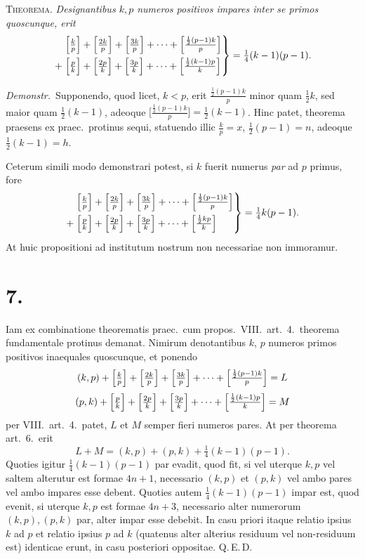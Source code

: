 \documentclass[11pt]{article}
\begin{document}
\textsc{Theorema.} \emph{Designantibus $k,p$ numeros positivos impares inter
se primos quoscunque, erit}
\[
  \left.
  \begin{aligned}
  &\Bigl[\tfrac{k}{p}\Bigr]+\Bigl[\tfrac{2k}{p}\Bigr]+\Bigl[\tfrac{3k}{p}\Bigr]
        +\dots+\Bigl[\tfrac{\frac{1}{2}(p-1)k}{p}\Bigr]\\
  +\;&\Bigl[\tfrac{p}{k}\Bigr]+\Bigl[\tfrac{2p}{k}\Bigr]+\Bigl[\tfrac{3p}{k}\Bigr]
        +\dots+\Bigl[\tfrac{\frac{1}{2}(k-1)p}{k}\Bigr]
  \end{aligned}
  \right\}=\tfrac{1}{4}(k-1)(p-1).
\]

\medskip
\emph{Demonstr.}\ Supponendo, quod licet, $k<p$, erit $\tfrac{\frac{1}{2}(p-1)k}{p}$
minor quam $\tfrac{1}{2}k$, sed maior quam $\tfrac{1}{2}(k-1)$, adeoque
$\bigl[\tfrac{\frac{1}{2}(p-1)k}{p}\bigr]=\tfrac{1}{2}(k-1)$. Hinc patet,
theorema praesens ex praec.\ protinus sequi, statuendo illic $\tfrac{k}{p}=x$,
$\tfrac{1}{2}(p-1)=n$, adeoque $\tfrac{1}{2}(k-1)=h$.

\medskip
Ceterum simili modo demonstrari potest, si $k$ fuerit numerus \emph{par} ad $p$
primus, fore
\[
  \left.
  \begin{aligned}
  &\Bigl[\tfrac{k}{p}\Bigr]+\Bigl[\tfrac{2k}{p}\Bigr]+\Bigl[\tfrac{3k}{p}\Bigr]
        +\dots+\Bigl[\tfrac{\frac{1}{2}(p-1)k}{p}\Bigr]\\
  +\;&\Bigl[\tfrac{p}{k}\Bigr]+\Bigl[\tfrac{2p}{k}\Bigr]+\Bigl[\tfrac{3p}{k}\Bigr]
        +\dots+\Bigl[\tfrac{\frac{1}{2}kp}{k}\Bigr]
  \end{aligned}
  \right\}=\tfrac{1}{4}k(p-1).
\]
At huic propositioni ad institutum nostrum non necessariae non immoramur.

\section*{7.}

Iam ex combinatione theorematis praec.\ cum propos.\ VIII.\ art.\ 4.\ theorema
fundamentale protinus demanat. Nimirum denotantibus $k$, $p$ numeros primos
positivos inaequales quoscunque, et ponendo
\[
  (k,p)+\Bigl[\tfrac{k}{p}\Bigr]+\Bigl[\tfrac{2k}{p}\Bigr]+\Bigl[\tfrac{3k}{p}\Bigr]
        +\dots+\Bigl[\tfrac{\frac{1}{2}(p-1)k}{p}\Bigr]=L
\]
\[
  (p,k)+\Bigl[\tfrac{p}{k}\Bigr]+\Bigl[\tfrac{2p}{k}\Bigr]+\Bigl[\tfrac{3p}{k}\Bigr]
        +\dots+\Bigl[\tfrac{\frac{1}{2}(k-1)p}{k}\Bigr]=M
\]
per VIII.\ art.\ 4.\ patet, $L$ et $M$ semper fieri numeros pares. At per
theorema art.\ 6.\ erit
\[
  L+M=(k,p)+(p,k)+\tfrac{1}{4}(k-1)(p-1).
\]
Quoties igitur $\tfrac{1}{4}(k-1)(p-1)$ par evadit, quod fit, si vel uterque
$k,p$ vel saltem alterutur est formae $4n+1$, necessario $(k,p)$ et $(p,k)$ vel
ambo pares vel ambo impares esse debent. Quoties autem $\tfrac{1}{4}(k-1)(p-1)$
impar est, quod evenit, si uterque $k,p$ est formae $4n+3$, necessario alter
numerorum $(k,p),(p,k)$ par, alter impar esse debebit. In casu priori itaque
relatio ipsius $k$ ad $p$ et relatio ipsius $p$ ad $k$ (quatenus alter alterius
residuum vel non-residuum est) identicae erunt, in casu posteriori oppositae.
\textsc{Q.\,E.\,D.}
\end{document}

